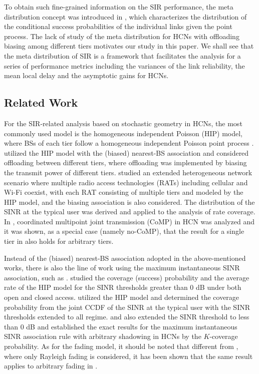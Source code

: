 \documentclass[12pt,draftclsnofoot,journal,onecolumn]{IEEEtran}
\begin{document}
To obtain such fine-grained information on the SIR performance, the meta distribution concept was introduced in \cite{MHmeta}, which characterizes the distribution of the conditional success probabilities of the individual links given the point process. The lack of study of the meta distribution for HCNs with offloading biasing among different tiers motivates our study in this paper. We shall see that the meta distribution of SIR is a framework that facilitates the analysis for a series of performance metrics including the variances of the link reliability, the mean local delay and the asymptotic gains for HCNs.
      
\subsection{Related Work}
For the SIR-related analysis based on stochastic geometry in HCNs, the most commonly used model is the homogeneous independent Poisson (HIP) model, where BSs of each tier follow a homogeneous independent Poisson point process \cite[Def.~2]{Haenggi14wcl}. \cite{Jo12} utilized the HIP model with the (biased) nearest-BS association and considered offloading between different tiers, where offloading was implemented by biasing the transmit power of different tiers. \cite{Singh13} studied an extended heterogeneous network scenario where multiple radio access technologies (RATs) including cellular and Wi-Fi coexist, with each RAT consisting of multiple tiers and modeled by the HIP model, and the biasing association is also considered. The distribution of the SINR at the typical user was derived and applied to the analysis of rate coverage. In \cite{nigam2014}, coordinated multipoint joint transmission (CoMP) in HCN was analyzed and it was shown, as a special case (namely no-CoMP), that the result for a single tier in \cite{Andrews11} also holds for arbitrary tiers.

Instead of the (biased) nearest-BS association adopted in the above-mentioned works, there is also the line of work using the maximum instantaneous SINR association, such as \cite{Dhillon12, Mukherjee12, Keeler13, Blaszczyszyn15, XZhang14}. \cite{Dhillon12} studied the coverage (success) probability and the average rate of the HIP model for the SINR thresholds greater than $0$ dB under both open and closed access. \cite{Mukherjee12} utilized the HIP model and determined the coverage probability from the joint CCDF of the SINR at the typical user with the SINR thresholds extended to all regime. \cite{Keeler13} and \cite{Blaszczyszyn15} also extended the SINR threshold to less than 0 dB and established the exact results for the maximum instantaneous SINR association rule with arbitrary shadowing in HCNs by the $K$-coverage probability. As for the fading model, it should be noted that different from \cite{Dhillon12}, where only Rayleigh fading is considered, it has been shown that the same result applies to arbitrary fading in \cite{XZhang14}.
\end{document}
